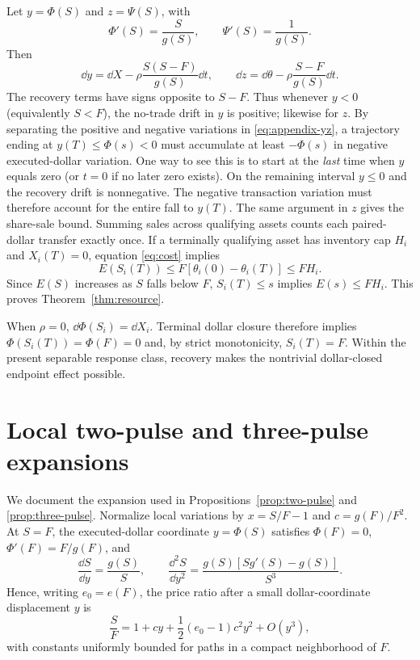 \documentclass[review,hidelinks,onefignum,onetabnum]{siamonline250211}
\begin{document}
Let $y=\Phi(S)$ and $z=\Psi(S)$, with
\[
\Phi'(S)=\frac{S}{g(S)},\qquad \Psi'(S)=\frac1{g(S)}.
\]
Then
\begin{equation}\label{eq:appendix-yz}
\dd y=\dd X-\rho\frac{S(S-F)}{g(S)}\dd t,
\qquad
\dd z=\dd\theta-\rho\frac{S-F}{g(S)}\dd t.
\end{equation}
The recovery terms have signs opposite to $S-F$. Thus whenever $y<0$ (equivalently $S<F$), the no-trade drift in $y$ is positive; likewise for $z$. By separating the positive and negative variations in \eqref{eq:appendix-yz}, a trajectory ending at $y(T)\le\Phi(s)<0$ must accumulate at least $-\Phi(s)$ in negative executed-dollar variation. One way to see this is to start at the \emph{last} time when $y$ equals zero (or $t=0$ if no later zero exists). On the remaining interval $y\le0$ and the recovery drift is nonnegative. The negative transaction variation must therefore account for the entire fall to $y(T)$. The same argument in $z$ gives the share-sale bound. Summing sales across qualifying assets counts each paired-dollar transfer exactly once. If a terminally qualifying asset has inventory cap $H_i$ and $X_i(T)=0$, equation \eqref{eq:cost} implies
\[
E(S_i(T))\le F\left[\theta_i(0)-\theta_i(T)\right]\le FH_i.
\]
Since $E(S)$ increases as $S$ falls below $F$, $S_i(T)\le s$ implies $E(s)\le FH_i$. This proves Theorem~\ref{thm:resource}.

When $\rho=0$, $\dd\Phi(S_i)=\dd X_i$. Terminal dollar closure therefore implies $\Phi(S_i(T))=\Phi(F)=0$ and, by strict monotonicity, $S_i(T)=F$. Within the present separable response class, recovery makes the nontrivial dollar-closed endpoint effect possible.

\section{Local two-pulse and three-pulse expansions}\label{app:local}
We document the expansion used in Propositions~\ref{prop:two-pulse} and \ref{prop:three-pulse}. Normalize local variations by $x=S/F-1$ and $c=g(F)/F^2$. At $S=F$, the executed-dollar coordinate $y=\Phi(S)$ satisfies $\Phi(F)=0$, $\Phi'(F)=F/g(F)$, and
\begin{equation}\label{eq:local-inverse}
\frac{\dd S}{\dd y}=\frac{g(S)}S,
\qquad
\frac{\dd^2 S}{\dd y^2}=
\frac{g(S)[Sg'(S)-g(S)]}{S^3}.
\end{equation}
Hence, writing $e_0=e(F)$, the price ratio after a small dollar-coordinate displacement $y$ is
\begin{equation}\label{eq:local-Taylor}
\frac SF=1+cy+\frac12(e_0-1)c^2y^2+O(y^3),
\end{equation}
with constants uniformly bounded for paths in a compact neighborhood of $F$.
\end{document}
